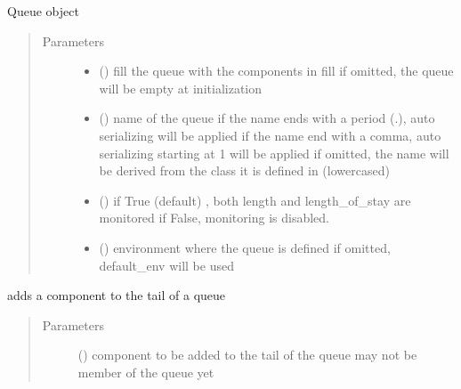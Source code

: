 \documentclass[letterpaper,10pt,english]{sphinxmanual}
\begin{document}
\begin{fulllineitems}
\label{\detokenize{Reference:salabim.Queue}}
Queue object
\begin{quote}\begin{description}
\item[{Parameters}] \leavevmode\begin{itemize}
\item {} 
 ({\hyperref[\detokenize{Reference:salabim.Queue}]{}}\sphinxstyleliteralemphasis{, }) \textendash{} fill the queue with the components in fill 
if omitted, the queue will be empty at initialization

\item {} 
 () \textendash{} name of the queue 
if the name ends with a period (.),
auto serializing will be applied 
if the name end with a comma,
auto serializing starting at 1 will be applied 
if omitted, the name will be derived from the class
it is defined in (lowercased)

\item {} 
 () \textendash{} if True (default) , both length and length\_of\_stay are monitored 
if False, monitoring is disabled.

\item {} 
 ({\hyperref[\detokenize{Reference:salabim.Environment}]{}}) \textendash{} environment where the queue is defined 
if omitted, default\_env will be used

\end{itemize}

\end{description}\end{quote}

\begin{fulllineitems}
\label{\detokenize{Reference:salabim.Queue.add}}
adds a component to the tail of a queue
\begin{quote}\begin{description}
\item[{Parameters}] \leavevmode
{} ({\hyperref[\detokenize{Reference:salabim.Component}]{}}) \textendash{} component to be added to the tail of the queue 
may not be member of the queue yet


\end{description}
\end{quote}
\end{fulllineitems}
\end{fulllineitems}
\end{document}
